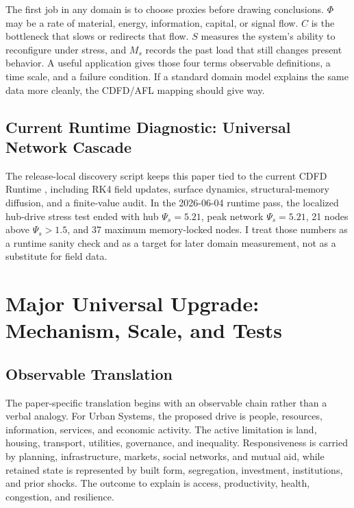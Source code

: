 \documentclass[11pt,a4paper]{article}
\begin{document}
The first job in any domain is to choose proxies before drawing conclusions. $\Phi$ may be a rate of material, energy, information, capital, or signal flow. $C$ is the bottleneck that slows or redirects that flow. $S$ measures the system's ability to reconfigure under stress, and $M_s$ records the past load that still changes present behavior. A useful application gives those four terms observable definitions, a time scale, and a failure condition. If a standard domain model explains the same data more cleanly, the CDFD/AFL mapping should give way.

\subsection{Current Runtime Diagnostic: Universal Network Cascade}
The release-local discovery script keeps this paper tied to the current CDFD Runtime \cite{CDFDRuntime2026}, including RK4 field updates, surface dynamics, structural-memory diffusion, and a finite-value audit. In the 2026-06-04 runtime pass, the localized hub-drive stress test ended with hub $\Psi_s=5.21$, peak network $\Psi_s=5.21$, 21 nodes above $\Psi_s>1.5$, and 37 maximum memory-locked nodes. I treat those numbers as a runtime sanity check and as a target for later domain measurement, not as a substitute for field data.


\section{Major Universal Upgrade: Mechanism, Scale, and Tests}

\subsection{Observable Translation}

The paper-specific translation begins with an observable chain rather than a
verbal analogy. For Urban Systems, the proposed drive is people, resources, information, services, and economic activity.
The active limitation is land, housing, transport, utilities, governance, and inequality. Responsiveness is carried by
planning, infrastructure, markets, social networks, and mutual aid, while retained state is represented by
built form, segregation, investment, institutions, and prior shocks. The outcome to explain is access, productivity, health, congestion, and resilience.
\end{document}
